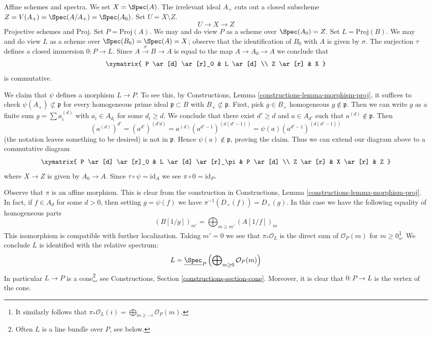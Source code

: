 \medskip\noindent
Affine schemes and spectra.
We set $X = \Spec(A)$. The irrelevant ideal $A_+$ cuts out a closed subscheme
$Z = V(A_+) = \Spec(A/A_+) = \Spec(A_0)$. Set $U = X \setminus Z$.
$$
U \longrightarrow X \longrightarrow Z
$$
Projective schemes and Proj. Set $P = \text{Proj}(A)$. We may
and do view $P$ as a scheme over $\Spec(A_0) = Z$.
Set $L = \text{Proj}(B)$. We may and do view $L$ as a scheme
over $\Spec(B_0) = \Spec(A) = X$; observe that the identification
of $B_0$ with $A$ is given by $\sigma$.
The surjection $\tau$ defines a closed immersion $0 : P \to L$.
Since $A \xrightarrow{\sigma} B \to A$ is equal to the map $A \to A_0 \to A$
we conclude that
$$
\xymatrix{
P \ar[d] \ar[r]_0 & L \ar[d] \\
Z \ar[r] & X
}
$$
is commutative.

\medskip\noindent
We claim that $\psi$ defines a morphism $L \to P$.
To see this, by Constructions, Lemma \ref{constructions-lemma-morphism-proj},
it suffices to check $\psi(A_+) \not \subset \mathfrak p$ for
every homogeneous prime ideal
$\mathfrak p \subset B$ with $B_+ \not \subset \mathfrak p$.
First, pick $g \in B_+$ homogeneous $g \not \in \mathfrak p$.
Then we can write $g$ as a finite sum $g = \sum a_i^{(d)}$
with $a_i \in A_{d_i}$ for some $d_i \geq d$.
We conclude that there exist $d' \geq d$ and $a \in A_{d'}$
such that $a^{(d)} \not \in \mathfrak p$.
Then
$$
(a^{(d)})^{d'} =
(a^{d'})^{(d'd)} =
a^{(d)} (a^{d' - 1})^{(d(d' - 1))} =
\psi(a) (a^{d' - 1})^{(d(d' - 1))}
$$
(the notation leaves something to be desired) is not in $\mathfrak p$.
Hence $\psi(a) \not \in \mathfrak p$, proving the claim.
Thus we can extend our diagram above to a commutative diagram
$$
\xymatrix{
P \ar[d] \ar[r]_0 & L \ar[d] \ar[r]_\pi & P \ar[d] \\
Z \ar[r] & X \ar[r] & Z
}
$$
where $X \to Z$ is given by $A_0 \to A$.
Since $\tau \circ \psi = \text{id}_A$ we see $\pi \circ 0 = \text{id}_P$.

\medskip\noindent
Observe that $\pi$ is an affine morphism. This is clear from the construction
in Constructions, Lemma \ref{constructions-lemma-morphism-proj}. In fact, if
$f \in A_d$ for some $d > 0$, then
setting $g = \psi(f)$ we have $\pi^{-1}(D_+(f)) = D_+(g)$.
In this case we have the following equality of homogeneous parts
$$
(B[1/g])_{m'} = \bigoplus\nolimits_{m \geq m'} (A[1/f])_m
$$
This isomorphism is compatible with further localization.
Taking $m' = 0$ we see that $\pi_*\mathcal{O}_L$ is the
direct sum of $\mathcal{O}_P(m)$ for $m \geq 0$\footnote{It similarly follows
that $\pi_*\mathcal{O}_L(i) = \bigoplus_{m \geq -i} \mathcal{O}_P(m)$.}.
We conclude $L$ is identified with the relative spectrum:
$$
L = \underline{\Spec}_P
\left(
\bigoplus\nolimits_{m \geq 0} \mathcal{O}_P(m)
\right)
$$
In particular $L \to P$ is a cone\footnote{Often $L$ is a line bundle
over $P$, see below.}, see
Constructions, Section \ref{constructions-section-cone}.
Moreover, it is clear that $0 : P \to L$ is the vertex of the cone.

